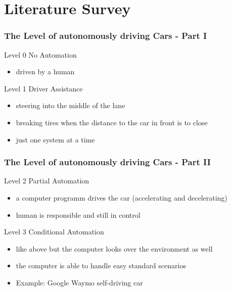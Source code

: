 \documentclass{beamer}
\begin{document}
\section{Literature Survey}
%
\begin{frame}
\frametitle{The Level of autonomously driving Cars - Part I}
\begin{block}{Level 0}
No Automation
\begin{itemize}
\item driven by a human
\end{itemize}
\end{block}
\begin{block}{Level 1}
Driver Assistance
\begin{itemize}
\item steering into the middle of the lane
\item breaking tires when the distance to the car in front is to close
\item just one system at a time 
\end{itemize}
\end{block}
\end{frame}
%
%
\begin{frame}
\frametitle{The Level of autonomously driving Cars - Part II}
\begin{block}{Level 2}
Partial Automation
\begin{itemize}
\item a computer programm drives the car (accelerating and decelerating)
\item human is responsible and still in control
\end{itemize}
\end{block}
\begin{block}{Level 3}
Conditional Automation
\begin{itemize}
\item like above but the computer looks over the environment as well
\item the computer is able to handle easy  standard scenarios
\item Example: Google Waymo self-driving car 
\end{itemize}
\end{block}
\end{frame}
%
%
\end{document}

